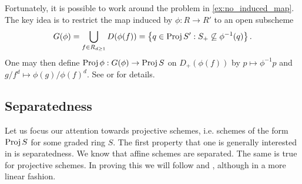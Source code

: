 \documentclass{article}
\begin{document}
Fortunately, it is possible to work around the problem in
\ref{ex:no_induced_map}. The key idea is to restrict the
map induced by $\phi : R\to R'$ to an open subscheme
\begin{align*}
  G(\phi)
  = \bigcup_{f \in R_{d\geq 1}} D(\phi(f))
  = \left\lbrace{q \in \operatorname{Proj}S' : S_+ \not\subseteq {\phi}^{-1}(q) }\right\rbrace.
\end{align*}
One may then define $\operatorname{Proj} \phi : G(\phi) \to \operatorname{Proj} S$ on
$D_+(\phi(f))$ by $p\mapsto {\phi}^{-1}p$ and
$g/f^d \mapsto \phi(g)/\phi(f)^d$. See \cite[p. 371]{gortz2010} or
\cite[p. 139]{ellingsrud2023} for details.

\subsection{Separatedness}

Let us focus our attention towards projective schemes, i.e. schemes
of the form $\operatorname{Proj} S$ for some graded ring $S$. The first property that
one is generally interested in is separatedness. We know that affine schemes are separated. The same is true for projective schemes. In proving
this we will follow \cite[\href{https://stacks.math.columbia.edu/tag/01KP}{Tag 01KP}]{stacks-project} and \cite[\href{https://stacks.math.columbia.edu/tag/01M3}{Tag 01M3}]{stacks-project}, although in a more linear fashion.
\end{document}
